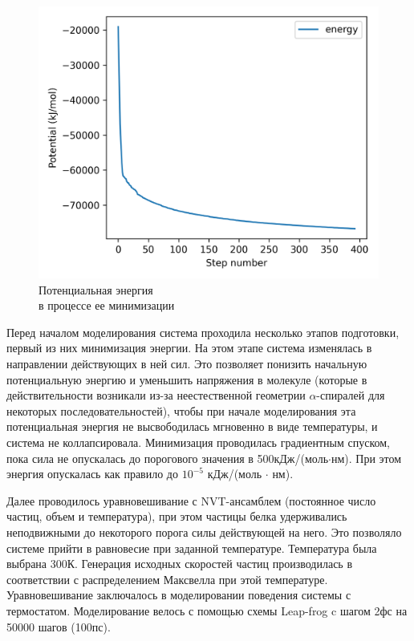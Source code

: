 \documentclass[
11pt,%
tightenlines,%
twoside,%
onecolumn,%
nofloats,%
nobibnotes,%
nofootinbib,%
superscriptaddress,%
noshowpacs,%
centertags]%
{revtex4}
\begin{document}
\begin{figure}
	\centering
	\includegraphics[scale=0.6]{potential}
	\caption{Потенциальная энергия \\ в процессе ее минимизации}
\end{figure}
Перед началом моделирования система проходила несколько этапов подготовки, первый из них минимизация энергии.
На этом этапе система изменялась в направлении действующих в ней сил. 
Это позволяет понизить начальную потенциальную энергию и уменьшить напряжения в молекуле
(которые в действительности возникали из-за неестественной геометрии $\alpha$-спиралей для некоторых последовательностей),
чтобы при начале моделирования эта потенциальная энергия не высвободилась мгновенно в виде температуры,
и система не коллапсировала.
Минимизация проводилась градиентным спуском, пока сила не опускалась до порогового значения в 500кДж/(моль$\cdot$нм). При этом энергия опускалась как правило до $10^{-5}$ кДж/(моль $\cdot$ нм). \par
Далее проводилось уравновешивание с NVT-ансамблем (постоянное число частиц, объем и температура),
при этом частицы белка удерживались неподвижными до некоторого порога силы действующей на него.
Это позволяло системе прийти в равновесие при заданной температуре. 
Температура была выбрана 300К. 
Генерация исходных скоростей частиц производилась в соответствии с распределением Максвелла при этой температуре.
Уравновешивание заключалось в моделировании поведения системы с термостатом.
Моделирование велось с помощью схемы Leap-frog c шагом 2фс на 50000 шагов (100пс).
\end{document}
